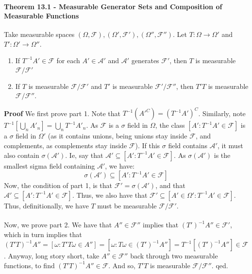 \documentclass[12pt,a4paper]{article}
\newcommand{\1}[1]{\mathbbm{1}\left\{ #1 \right\}}
\newcommand{\acal}{\mathcal{A}}
\newcommand{\fcal}{\mathcal{F}}
\begin{document}
\paragraph{Theorem 13.1 - Measurable Generator Sets and Composition of Measurable Functions} Take measurable spaces $(\Omega,\fcal),(\Omega',\fcal'),(\Omega'',\fcal'')$. Let $T: \Omega \to \Omega'$ and $T': \Omega' \to \Omega''$.
\begin{enumerate}
	\item If $T^{-1}A' \in \fcal$ for each $A' \in \acal'$ and $\acal'$ generates $\fcal'$, then $T$ is measurable $\fcal/\fcal'$
	
	\item If $T$ is measurable $\fcal/\fcal'$ and $T'$ is measurable $\fcal'/\fcal''$, then $T'T$ is measurable $\fcal/\fcal''$.
\end{enumerate}
\textbf{Proof} We first prove part 1. Note that $T^{-1}(A'^C) = (T^{-1}A')^C$. Similarly, note $T^{-1}\left[\bigcup_n A'_n\right] = \bigcup_n T^{-1}A'_n$. As $\fcal$ is a $\sigma$ field in $\Omega$, the class $[A' : T^{-1}A' \in \fcal]$ is a $\sigma$ field in $\Omega'$ (as it contains unions, being unions stay inside $\fcal$, and complements, as complements stay inside $\fcal$). If this $\sigma$ field contains $\acal'$, it must also contain $\sigma(\acal')$. Ie, say that $\acal' \subseteq [A' : T^{-1}A' \in \fcal]$. As $\sigma(\acal')$ is the smallest sigma field containing $\acal'$, we have:
$$
	\sigma(\acal') \subseteq [A' : T^{-1}A' \in \fcal]
$$
Now, the condition of part 1, is that $\fcal' = \sigma(\acal')$, and that $\acal' \subseteq [A' : T^{-1}A' \in \fcal]$. Thus, we also have that $\fcal' \subseteq [A' \in \Omega' : T^{-1}A' \in \fcal]$. Thus, definitionally, we have $T$ must be measurable $\fcal/\fcal'$.
\\\\
Now, we prove part 2. We have that $A'' \in \fcal''$ implies that $(T')^{-1}A'' \in \fcal'$, which in turn implies that $(T'T)^{-1}A'' = \left[\omega : T'T\omega \in A''\right] = \left[\omega: T\omega \in (T')^{-1}A''\right] = T^{-1}\left[(T')^{-1}A''\right] \in \fcal$. Anyway, long story short, take $A'' \in \fcal''$ back through two measurable functions, to find $(T'T)^{-1}A'' \in \fcal$. And so, $T'T$ is measurable $\fcal/\fcal''$. qed.
\end{document}
